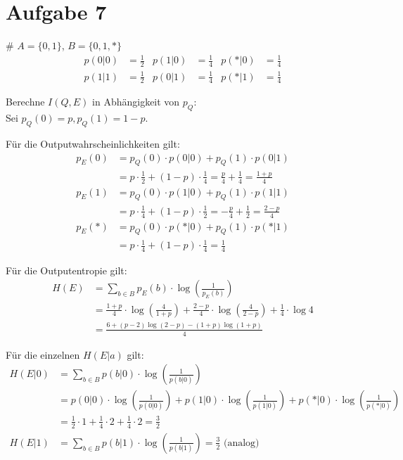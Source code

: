 \section*{Aufgabe 7}
\begin{myList}
#
$A = \lbrace 0,1 \rbrace$, $B = \lbrace 0,1,\ast \rbrace$
\begin{align*}
	p(0|0) &= \frac{1}{2} & p(1|0) &= \frac{1}{4} & p(\ast|0) &= \frac{1}{4} \\
	p(1|1) &= \frac{1}{2} & p(0|1) &= \frac{1}{4} & p(\ast|1) &= \frac{1}{4} 
\end{align*}

Berechne $I(Q,E)$ in Abhängigkeit von $p_Q$:\\
Sei $p_Q(0) = p, p_Q(1) = 1-p$.

Für die Outputwahrscheinlichkeiten gilt:
\begin{align*}
	p_E(0) &= p_Q(0) \cdot p(0|0) + p_Q(1) \cdot p(0|1)\\
	&= p \cdot \frac{1}{2} + (1-p) \cdot \frac{1}{4}  = \frac{p}{4} + \frac{1}{4} = \frac{1 + p}{4}\\
	p_E(1) &= p_Q(0) \cdot p(1|0) + p_Q(1) \cdot p(1|1)\\
	&= p \cdot \frac{1}{4} + (1-p) \cdot \frac{1}{2} = -\frac{p}{4} + \frac{1}{2} = \frac{2 - p}{4}\\
	p_E(\ast) &= p_Q(0) \cdot p(\ast|0) + p_Q(1) \cdot p(\ast|1)\\
	&= p \cdot \frac{1}{4} + (1-p) \cdot \frac{1}{4} = \frac{1}{4}
\end{align*}

Für die Outputentropie gilt:
\begin{align*}
	H(E) &= \sum\limits_{b \in B} p_E(b) \cdot \log \left( \frac{1}{p_E(b)}\right) \\
	&= \frac{1+p}{4}\cdot \log \left( \frac{4}{1+p}\right) + \frac{2-p}{4} \cdot \log \left( \frac{4}{2-p} \right) + \frac{1}{4}\cdot \log 4 \\
	&= \frac{6 + (p-2)\log(2-p) - (1+p)\log(1+p)}{4}
\end{align*}

Für die einzelnen $H(E|a)$ gilt:
\begin{align*}
	H(E|0) &= \sum\limits_{b\in B} p(b|0) \cdot \log \left(\frac{1}{p(b|0)} \right)\\
	&= p(0|0) \cdot \log \left(\frac{1}{p(0|0)} \right) + p(1|0) \cdot \log \left(\frac{1}{p(1|0)} \right) + p(\ast|0) \cdot \log \left(\frac{1}{p(\ast|0)} \right)\\
	&= \frac{1}{2} \cdot 1 + \frac{1}{4} \cdot 2 + \frac{1}{4} \cdot 2 = \frac{3}{2}\\
	H(E|1) &= \sum\limits_{b\in B} p(b|1) \cdot \log \left(\frac{1}{p(b|1)} \right) = \frac{3}{2} \text{ (analog)}
\end{align*}


\end{myList}
